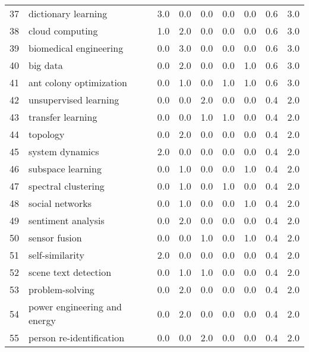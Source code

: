 \begin{tabular}{llrrrrrrr}
37 &                dictionary learning &   3.0 &   0.0 &   0.0 &   0.0 &   0.0 &   0.6 &    3.0 \\
38 &                    cloud computing &   1.0 &   2.0 &   0.0 &   0.0 &   0.0 &   0.6 &    3.0 \\
39 &             biomedical engineering &   0.0 &   3.0 &   0.0 &   0.0 &   0.0 &   0.6 &    3.0 \\
40 &                           big data &   0.0 &   2.0 &   0.0 &   0.0 &   1.0 &   0.6 &    3.0 \\
41 &            ant colony optimization &   0.0 &   1.0 &   0.0 &   1.0 &   1.0 &   0.6 &    3.0 \\
42 &              unsupervised learning &   0.0 &   0.0 &   2.0 &   0.0 &   0.0 &   0.4 &    2.0 \\
43 &                  transfer learning &   0.0 &   0.0 &   1.0 &   1.0 &   0.0 &   0.4 &    2.0 \\
44 &                           topology &   0.0 &   2.0 &   0.0 &   0.0 &   0.0 &   0.4 &    2.0 \\
45 &                    system dynamics &   2.0 &   0.0 &   0.0 &   0.0 &   0.0 &   0.4 &    2.0 \\
46 &                  subspace learning &   0.0 &   1.0 &   0.0 &   0.0 &   1.0 &   0.4 &    2.0 \\
47 &                spectral clustering &   0.0 &   1.0 &   0.0 &   1.0 &   0.0 &   0.4 &    2.0 \\
48 &                    social networks &   0.0 &   1.0 &   0.0 &   0.0 &   1.0 &   0.4 &    2.0 \\
49 &                 sentiment analysis &   0.0 &   2.0 &   0.0 &   0.0 &   0.0 &   0.4 &    2.0 \\
50 &                      sensor fusion &   0.0 &   0.0 &   1.0 &   0.0 &   1.0 &   0.4 &    2.0 \\
51 &                    self-similarity &   2.0 &   0.0 &   0.0 &   0.0 &   0.0 &   0.4 &    2.0 \\
52 &               scene text detection &   0.0 &   1.0 &   1.0 &   0.0 &   0.0 &   0.4 &    2.0 \\
53 &                    problem-solving &   0.0 &   2.0 &   0.0 &   0.0 &   0.0 &   0.4 &    2.0 \\
54 &       power engineering and energy &   0.0 &   2.0 &   0.0 &   0.0 &   0.0 &   0.4 &    2.0 \\
55 &           person re-identification &   0.0 &   0.0 &   2.0 &   0.0 &   0.0 &   0.4 &    2.0 \\

\end{tabular}
